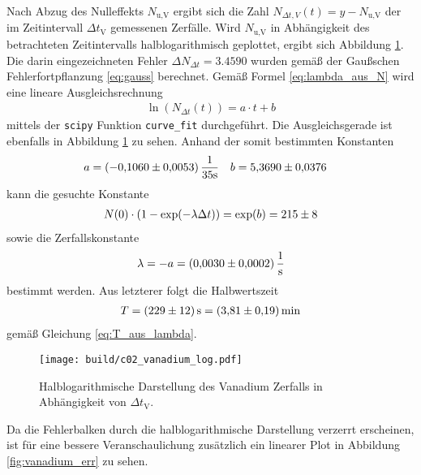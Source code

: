 \noindent
Nach Abzug des Nulleffekts $N_\text{u,V}$ ergibt sich die Zahl $N_{\Delta t,V}(t) = y- N_\text{u,V}$ der im Zeitintervall $\Delta t_\text{V}$
gemessenen Zerfälle.
Wird $N_\text{u,V}$ in Abhängigkeit des betrachteten Zeitintervalls halblogarithmisch geplottet, ergibt sich Abbildung \ref{fig:vanadium_log}.
Die darin eingezeichneten Fehler $\Delta N_{\Delta t} = \num[]{3.4590}$ wurden gemäß der Gaußschen Fehlerfortpflanzung \eqref{eq:gauss} berechnet.
Gemäß Formel \eqref{eq:lambda_aus_N} wird eine lineare Ausgleichsrechnung 
\begin{align}
    \ln\left(N_{\Delta t}(t)\right) = a \cdot t + b
    \label{eq:linear_eq}
\end{align}
mittels der \texttt{scipy} \cite[]{scipy} Funktion \texttt{curve\_fit} durchgeführt.
Die Ausgleichsgerade ist ebenfalls in Abbildung \ref{fig:vanadium_log} zu sehen.
Anhand der somit bestimmten Konstanten
\begin{align*}
    a &= (\num{-0.1060 +- 0.0053}) \, \frac{1}{35 \unit{\second}}  & b &= \num{5.3690 +- 0.0376}
\end{align*}
kann die gesuchte Konstante 
\begin{align}
    N(0) \cdot \left(1- \exp(- \lambda \Delta t)\right) = \exp(b) = \num[]{215 +- 8}
\end{align}
sowie die Zerfallskonstante 
\begin{align}
    \lambda = - a = \qty[]{0.0030+-0.0002}{\per\second}
\end{align}
bestimmt werden.
Aus letzterer folgt die Halbwertszeit 
\begin{align}
    T = \qty[]{229 +- 12}{\second} = \qty[]{3.81 +- 0.19}{\minute}
\end{align}
gemäß Gleichung \eqref{eq:T_aus_lambda}.


\begin{figure}[H]
    \centering
    \texttt{[image: build/c02\_vanadium\_log.pdf]}
    \caption[]{Halblogarithmische Darstellung des Vanadium Zerfalls in Abhängigkeit von $\Delta t_\text{V}$.}
    \label{fig:vanadium_log}
\end{figure}

\noindent
Da die Fehlerbalken durch die halblogarithmische Darstellung verzerrt erscheinen, ist für eine bessere Veranschaulichung zusätzlich ein linearer
Plot in Abbildung \ref{fig:vanadium_err} zu sehen.

